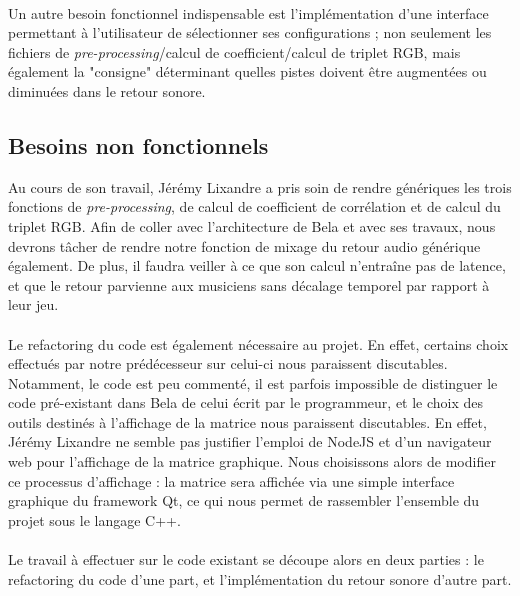 \paragraph{}
Un autre besoin fonctionnel indispensable est l'implémentation d'une
interface permettant à l'utilisateur de sélectionner ses
configurations ; non seulement les fichiers de
\textit{pre-processing}/calcul de coefficient/calcul de triplet RGB,
mais également la "consigne" déterminant quelles pistes doivent être
augmentées ou diminuées dans le retour sonore.

\subsection{Besoins non fonctionnels}
Au cours de son travail, Jérémy Lixandre a pris soin de rendre
génériques les trois fonctions de \textit{pre-processing}, de calcul
de coefficient de corrélation et de calcul du triplet RGB. Afin de
coller avec l'architecture de Bela et avec ses travaux, nous devrons
tâcher de rendre notre fonction de mixage du retour audio générique
également. De plus, il faudra veiller à ce que son calcul n'entraîne
pas de latence, et que le retour parvienne aux musiciens sans décalage
temporel par rapport à leur jeu.
\paragraph{}
Le refactoring du code est également nécessaire au projet. En effet,
certains choix effectués par notre prédécesseur sur celui-ci nous
paraissent discutables. Notamment, le code est peu commenté, il est
parfois impossible de distinguer le code pré-existant dans Bela de
celui écrit par le programmeur, et le choix des outils destinés à
l'affichage de la matrice nous paraissent discutables. En effet,
Jérémy Lixandre ne semble pas justifier l'emploi de NodeJS et d'un
navigateur web pour l'affichage de la matrice graphique. Nous
choisissons alors de modifier ce processus d'affichage : la matrice
sera affichée via une simple interface graphique du framework Qt, ce
qui nous permet de rassembler l'ensemble du projet sous le langage
C++.
\paragraph{}
Le travail à effectuer sur le code existant se découpe alors en deux
parties : le refactoring du code d'une part, et l'implémentation du
retour sonore d'autre part.


